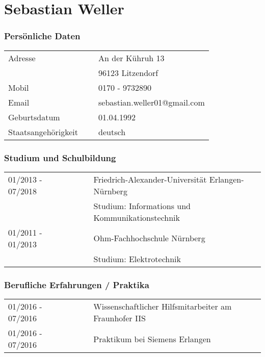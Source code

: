 

\chapter*{Sebastian Weller}


\flushright
\subsection*{Persönliche Daten}
\flushleft
\normalsize
\begin{tabular}{lcl}
Adresse             & ~ & An der Kühruh 13\\
                    & ~ & 96123 Litzendorf\\[5pt]
Mobil               & ~ & 0170 - 9732890\\
Email               & ~ & sebastian.weller01@gmail.com\\[5pt]
Geburtsdatum        & ~ & 01.04.1992\\
Staatsangehörigkeit & ~ & deutsch\\
\end{tabular} 

\nopagebreak
\subsection*{Studium und Schulbildung}
\begin{tabular}{lcl}
01/2013 - 07/2018     & ~~~ &  Friedrich-Alexander-Universität Erlangen-Nürnberg\\
                      & ~~~ &  Studium: Informations und Kommunikationstechnik \\
01/2011 - 01/2013     & ~~~ &  Ohm-Fachhochschule Nürnberg\\
                      & ~~~ &  Studium: Elektrotechnik\\
\end{tabular}

\subsection*{Berufliche Erfahrungen / Praktika}
\begin{tabular}{lcl}
01/2016 - 07/2016     & ~~~ &  Wissenschaftlicher Hilfsmitarbeiter am Fraunhofer IIS\\
01/2016 - 07/2016     & ~~~ &  Praktikum bei Siemens Erlangen\\
\end{tabular}
